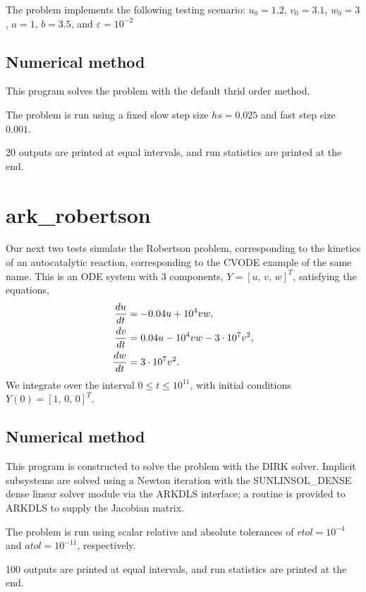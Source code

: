 \documentclass[letterpaper,10pt,english]{sphinxmanual}
\begin{document}
The problem implements the following testing scenario: \(u_0=1.2\),
\(v_0=3.1\),  \(w_0=3\), \(a=1\), \(b=3.5\), and
\(\varepsilon=10^{-2}\)


\subsection{Numerical method}
\label{c_serial:id11}
This program solves the problem with the default thrid order method.

The problem is run using a fixed slow step size \(hs=0.025\) and fast step
size \(0.001\).

20 outputs are printed at equal intervals, and run statistics
are printed at the end.


\section{ark\_robertson}
\label{c_serial:ark-robertson}\label{c_serial:id12}
Our next two tests simulate the Robertson problem, corresponding to the
kinetics of an autocatalytic reaction, corresponding to the CVODE
example of the same name.  This is an ODE system with 3
components, \(Y = [u,\, v,\, w]^T\), satisfying the equations,
\begin{gather}
\begin{split}\frac{du}{dt} &= -0.04 u + 10^4 v w, \\
\frac{dv}{dt} &= 0.04 u - 10^4 v w - 3\cdot10^7 v^2, \\
\frac{dw}{dt} &= 3\cdot10^7 v^2.\end{split}\notag
\end{gather}
We integrate over the interval \(0\le t\le 10^{11}\), with initial
conditions  \(Y(0) = [1,\, 0,\, 0]^T\).


\subsection{Numerical method}
\label{c_serial:id13}
This program is constructed to solve the problem with the DIRK solver.
Implicit subsystems are solved using a Newton iteration with the
SUNLINSOL\_DENSE dense linear solver module via the ARKDLS interface; a
routine is provided to ARKDLS to supply the Jacobian matrix.

The problem is run using scalar relative and absolute tolerances of
\(rtol=10^{-4}\) and \(atol=10^{-11}\), respectively.

100 outputs are printed at equal intervals, and run statistics are
printed at the end.
\end{document}
